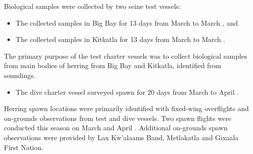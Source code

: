 Biological samples were collected by two seine test vessels:

\begin{itemize}

\item The  collected samples in Big Bay
for 13 days from March  to March , and 

\item The  collected samples in Kitkatla
for 13 days from March  to March .

\end{itemize}

The primary purpose of the test charter vessels was to
collect biological samples from main bodies of herring
from Big Bay and Kitkatla, identified from soundings.

\begin{itemize}

\item The dive charter vessel  surveyed spawn
for 20 days from March  to April .

\end{itemize}

Herring spawn locations were primarily identified with
fixed-wing overflights and on-grounds observations from test and dive vessels.
Two spawn flights were conducted this season on March  and April .
Additional on-grounds spawn observations were provided by
Lax Kw'alaams Band, Metlakatla and Gixaala First Nation.
